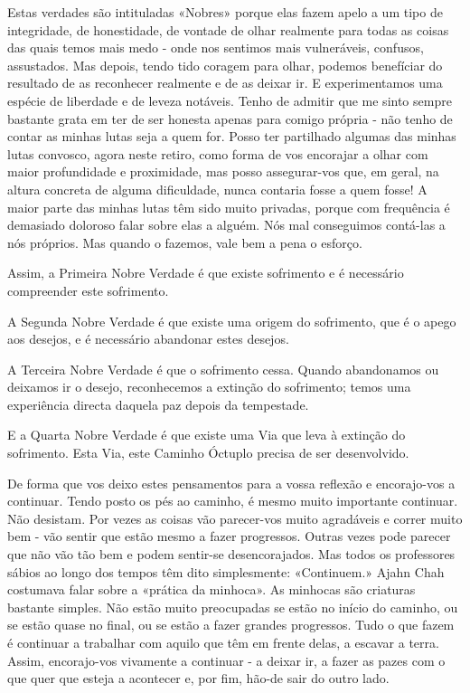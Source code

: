 Estas verdades são intituladas «Nobres» porque elas fazem apelo a um
tipo de integridade, de honestidade, de vontade de olhar realmente para
todas as coisas das quais temos mais medo - onde nos sentimos mais
vulneráveis, confusos, assustados. Mas depois, tendo tido coragem para
olhar, podemos benefíciar do resultado de as reconhecer realmente e de
as deixar ir. E experimentamos uma espécie de liberdade e de leveza
notáveis. Tenho de admitir que me sinto sempre bastante grata em ter de
ser honesta apenas para comigo própria - não tenho de contar as minhas
lutas seja a quem for. Posso ter partilhado algumas das minhas lutas
convosco, agora neste retiro, como forma de vos encorajar a olhar com
maior profundidade e proximidade, mas posso assegurar-vos que, em geral,
na altura concreta de alguma dificuldade, nunca contaria fosse a quem
fosse! A maior parte das minhas lutas têm sido muito privadas, porque
com frequência é demasiado doloroso falar sobre elas a alguém. Nós mal
conseguimos contá-las a nós próprios. Mas quando o fazemos, vale bem a
pena o esforço.

Assim, a Primeira Nobre Verdade é que existe sofrimento e é necessário
compreender este sofrimento.

A Segunda Nobre Verdade é que existe uma origem do sofrimento, que é o
apego aos desejos, e é necessário abandonar estes desejos.

A Terceira Nobre Verdade é que o sofrimento cessa. Quando abandonamos ou
deixamos ir o desejo, reconhecemos a extinção do sofrimento; temos uma
experiência directa daquela paz depois da tempestade.

E a Quarta Nobre Verdade é que existe uma Via que leva à extinção do
sofrimento. Esta Via, este Caminho Óctuplo precisa de ser desenvolvido.

De forma que vos deixo estes pensamentos para a vossa reflexão e
encorajo-vos a continuar. Tendo posto os pés ao caminho, é mesmo muito
importante continuar. Não desistam. Por vezes as coisas vão parecer-vos
muito agradáveis e correr muito bem - vão sentir que estão mesmo a fazer
progressos. Outras vezes pode parecer que não vão tão bem e podem
sentir-se desencorajados. Mas todos os professores sábios ao longo dos
tempos têm dito simplesmente: «Continuem.» Ajahn Chah costumava falar
sobre a «prática da minhoca». As minhocas são criaturas bastante
simples. Não estão muito preocupadas se estão no início do caminho, ou
se estão quase no final, ou se estão a fazer grandes progressos. Tudo o
que fazem é continuar a trabalhar com aquilo que têm em frente delas, a
escavar a terra. Assim, encorajo-vos vivamente a continuar - a deixar
ir, a fazer as pazes com o que quer que esteja a acontecer e, por fim,
hão-de sair do outro lado.

